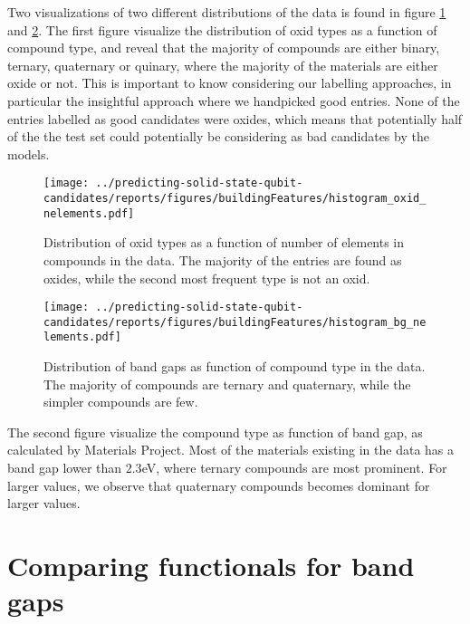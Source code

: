 Two visualizations of two different distributions of the data is found in figure \ref{fig:hist_ox} and \ref{fig:hist_bg}. The first figure visualize the distribution of oxid types as a function of compound type, and reveal that the majority of compounds are either binary, ternary, quaternary or quinary, where the majority of the materials are either oxide or not. This is important to know considering our labelling approaches, in particular the insightful approach where we handpicked good entries. None of the entries labelled as good candidates were oxides, which means that potentially half of the the test set could potentially be considering as bad candidates by the models.

\clearpage

\begin{figure}
      \centering
      \texttt{[image: ../predicting-solid-state-qubit-candidates/reports/figures/buildingFeatures/histogram\_oxid\_nelements.pdf]}
      \vspace*{-130mm}
      \caption{Distribution of oxid types as a function of number of elements in compounds in the data. The majority of the entries are found as oxides, while the second most frequent type is not an oxid. }
      \label{fig:hist_ox}
\end{figure}

\begin{figure}
      \centering
      \texttt{[image: ../predicting-solid-state-qubit-candidates/reports/figures/buildingFeatures/histogram\_bg\_nelements.pdf]}
      \vspace*{-130mm}
      \caption{Distribution of band gaps as function of compound type in the data. The majority of compounds are ternary and quaternary, while the simpler compounds are few.}
      \label{fig:hist_bg}
\end{figure}

\clearpage

\noindent The second figure visualize the compound type as function of band gap, as calculated by Materials Project. Most of the materials existing in the data has a band gap lower than $2.3$eV, where ternary compounds are most prominent. For larger values, we observe that quaternary compounds becomes dominant for larger values.

\section{Comparing functionals for band gaps}

